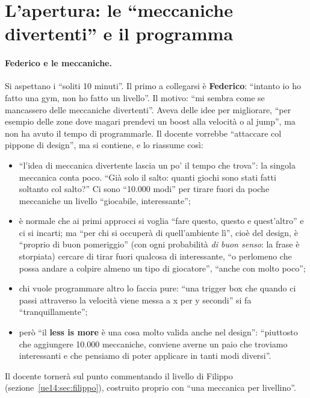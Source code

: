 \section{L'apertura: le ``meccaniche divertenti'' e il programma}
\label{ue14:sec:apertura}

\paragraph{Federico e le meccaniche.} Si aspettano i ``soliti 10 minuti''. Il primo a
collegarsi è \textbf{Federico}: ``intanto io ho fatto una gym, non ho fatto un livello''. Il
motivo: ``mi sembra come se mancassero delle meccaniche divertenti''. Aveva delle idee per
migliorare, ``per esempio delle zone dove magari prendevi un boost alla velocità o al
jump'', ma non ha avuto il tempo di programmarle. Il docente vorrebbe ``attaccare col
pippone di design'', ma si contiene, e lo riassume così:
\begin{itemize}
  \item ``l'idea di meccanica divertente lascia un po' il tempo che trova'': la singola
        meccanica conta poco. ``Già solo il salto: quanti giochi sono stati fatti soltanto
        col salto?'' Ci sono ``10.000 modi'' per tirare fuori da poche meccaniche un livello
        ``giocabile, interessante'';
  \item è normale che ai primi approcci si voglia ``fare questo, questo e quest'altro'' e ci
        si incarti; ma ``per chi si occuperà di quell'ambiente lì'', cioè del design, è
        ``proprio di buon pomeriggio'' (con ogni probabilità \emph{di buon senso}: la frase è
        storpiata) cercare di tirar fuori qualcosa di interessante, ``o perlomeno che possa
        andare a colpire almeno un tipo di giocatore'', ``anche con molto poco'';
  \item chi vuole programmare altro lo faccia pure: ``una trigger box che quando ci passi
        attraverso la velocità viene messa a x per y secondi'' si fa ``tranquillamente'';
  \item però ``il \textbf{less is more} è una cosa molto valida anche nel design'':
        ``piuttosto che aggiungere 10.000 meccaniche, conviene averne un paio che troviamo
        interessanti e che pensiamo di poter applicare in tanti modi diversi''.
\end{itemize}
Il docente tornerà sul punto commentando il livello di Filippo
(sezione~\ref{ue14:sec:filippo}), costruito proprio con ``una meccanica per livellino''.

